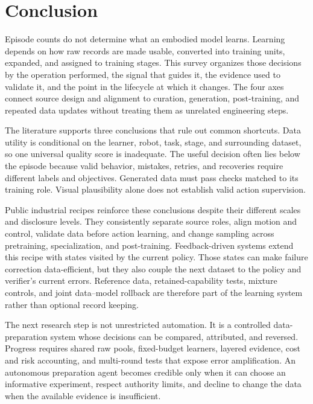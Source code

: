 \section{Conclusion}
\label{sec:conclusion}

Episode counts do not determine what an embodied model learns.
Learning depends on how raw records are made usable, converted into training units, expanded, and assigned to training stages.
This survey organizes those decisions by the operation performed, the signal that guides it, the evidence used to validate it, and the point in the lifecycle at which it changes.
The four axes connect source design and alignment to curation, generation, post-training, and repeated data updates without treating them as unrelated engineering steps.

The literature supports three conclusions that rule out common shortcuts.
Data utility is conditional on the learner, robot, task, stage, and surrounding dataset, so one universal quality score is inadequate.
The useful decision often lies below the episode because valid behavior, mistakes, retries, and recoveries require different labels and objectives.
Generated data must pass checks matched to its training role.
Visual plausibility alone does not establish valid action supervision.

Public industrial recipes reinforce these conclusions despite their different scales and disclosure levels.
They consistently separate source roles, align motion and control, validate data before action learning, and change sampling across pretraining, specialization, and post-training.
Feedback-driven systems extend this recipe with states visited by the current policy.
Those states can make failure correction data-efficient, but they also couple the next dataset to the policy and verifier's current errors.
Reference data, retained-capability tests, mixture controls, and joint data--model rollback are therefore part of the learning system rather than optional record keeping.

The next research step is not unrestricted automation.
It is a controlled data-preparation system whose decisions can be compared, attributed, and reversed.
Progress requires shared raw pools, fixed-budget learners, layered evidence, cost and risk accounting, and multi-round tests that expose error amplification.
An autonomous preparation agent becomes credible only when it can choose an informative experiment, respect authority limits, and decline to change the data when the available evidence is insufficient.
